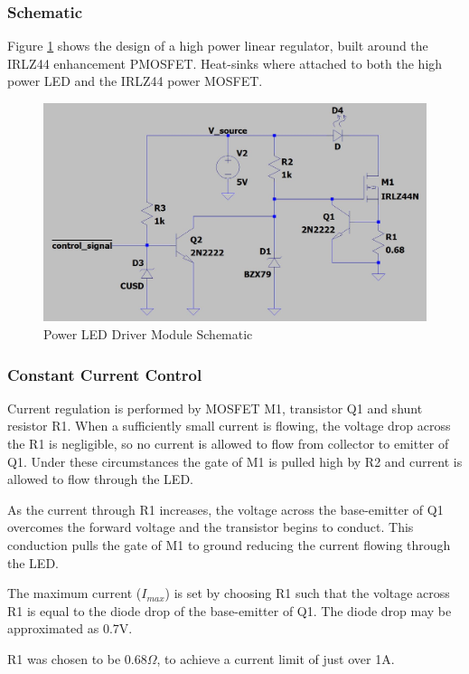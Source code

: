 \subsubsection{Schematic}
Figure \ref{fig:schematic_power_led_driver} shows the design of a high power linear regulator, built around the IRLZ44 enhancement PMOSFET. Heat-sinks where attached to both the high power LED and the IRLZ44 power MOSFET.

\begin{figure}[H]
	\centering
	\includegraphics[width=.8\textwidth]{figures/design/power_led_driver.JPG}
	\caption{Power LED Driver Module Schematic}
	\label{fig:schematic_power_led_driver}
\end{figure}

\subsubsection{Constant Current Control}

Current regulation is performed by MOSFET M1, transistor Q1 and shunt resistor R1. When a sufficiently small current is flowing, the voltage drop across the R1 is negligible, so no current is allowed to flow from collector to emitter of Q1. Under these circumstances the gate of M1 is pulled high by R2 and current is allowed to flow through the LED.

As the current through R1 increases, the voltage across the base-emitter of Q1 overcomes the forward voltage and the transistor begins to conduct. This conduction pulls the gate of M1 to ground reducing the current flowing through the LED.

The maximum current ($I_{max}$) is set by choosing R1 such that the voltage across R1 is equal to the diode drop of the base-emitter of Q1. The diode drop may be approximated as 0.7V.

R1 was chosen to be $0.68\Omega$, to achieve a current limit of just over 1A.


